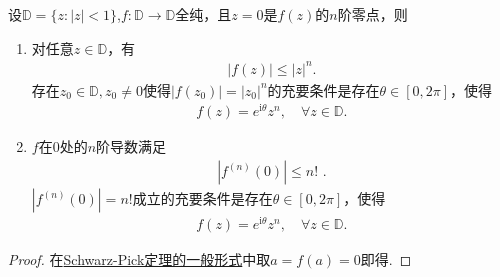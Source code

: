 \documentclass[../../main.tex]{subfiles}%
\begin{document}
\begin{theorem}[Schwarz定理的一般形式]\label{theorem:Schwarz定理的一般形式}
设$\mathbb{D} = \{z: |z| < 1\}$,$f: \mathbb{D} \to \mathbb{D}$全纯，且$z=0$是$f(z)$的$n$阶零点，则
\begin{enumerate}[(1)]
\item 对任意$z\in\mathbb{D}$，有
\begin{align*}
|f(z)| \leqslant |z|^n.
\end{align*}
存在$z_0\in\mathbb{D}, z_0\neq 0$使得$|f(z_0)|=|z_0|^n$的充要条件是存在$\theta\in[0,2\pi]$，使得
\begin{align*}
f(z) = e^{\mathrm{i}\theta} z^n,\quad \forall z\in\mathbb{D}.
\end{align*}

\item $f$在$0$处的$n$阶导数满足
\begin{align*}
|f^{(n)}(0)| \leqslant n!\,\,.
\end{align*}
$|f^{(n)}(0)|=n!$成立的充要条件是存在$\theta\in[0,2\pi]$，使得
\begin{align*}
f(z) = e^{\mathrm{i}\theta} z^n,\quad \forall z\in\mathbb{D}.
\end{align*}
\end{enumerate}
\end{theorem}
\begin{proof}
在\hyperref[theorem:Schwarz-Pick定理的一般形式]{Schwarz-Pick定理的一般形式}中取$a=f(a)=0$即得.
\end{proof}
\end{document}
